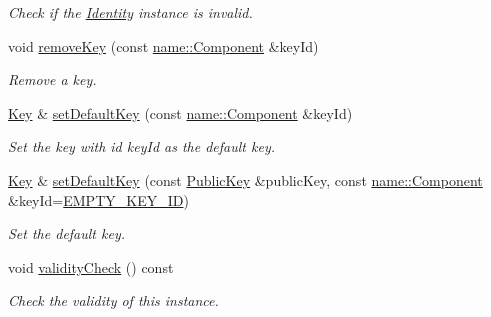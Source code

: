 \begin{DoxyCompactItemize}
\begin{DoxyCompactList}\small\item\em Check if the \hyperlink{classndn_1_1security_1_1Identity}{Identity} instance is invalid. \end{DoxyCompactList}\item 
void \hyperlink{classndn_1_1security_1_1Identity_a1c55e641d6a81ca1596f690aa23a457e}{remove\+Key} (const \hyperlink{classndn_1_1name_1_1Component}{name\+::\+Component} \&key\+Id)
\begin{DoxyCompactList}\small\item\em Remove a key. \end{DoxyCompactList}\item 
\hyperlink{classndn_1_1security_1_1Key}{Key} \& \hyperlink{classndn_1_1security_1_1Identity_aac7227d1760f894706d9b46831ad2623}{set\+Default\+Key} (const \hyperlink{classndn_1_1name_1_1Component}{name\+::\+Component} \&key\+Id)
\begin{DoxyCompactList}\small\item\em Set the key with id {\ttfamily key\+Id} as the default key. \end{DoxyCompactList}\item 
\hyperlink{classndn_1_1security_1_1Key}{Key} \& \hyperlink{classndn_1_1security_1_1Identity_a039ead9d41508dc8fea587a223c8fe27}{set\+Default\+Key} (const \hyperlink{classndn_1_1PublicKey}{Public\+Key} \&public\+Key, const \hyperlink{classndn_1_1name_1_1Component}{name\+::\+Component} \&key\+Id=\hyperlink{classndn_1_1security_1_1Identity_a4cbc752ea1f032e469cd886d6ba6ed96}{E\+M\+P\+T\+Y\+\_\+\+K\+E\+Y\+\_\+\+ID})
\begin{DoxyCompactList}\small\item\em Set the default key. \end{DoxyCompactList}\item 
void \hyperlink{classndn_1_1security_1_1Identity_a8a2d19cb40640fc9e6ebe57d1bb9ae2e}{validity\+Check} () const
\begin{DoxyCompactList}\small\item\em Check the validity of this instance. \end{DoxyCompactList}\end{DoxyCompactItemize}
